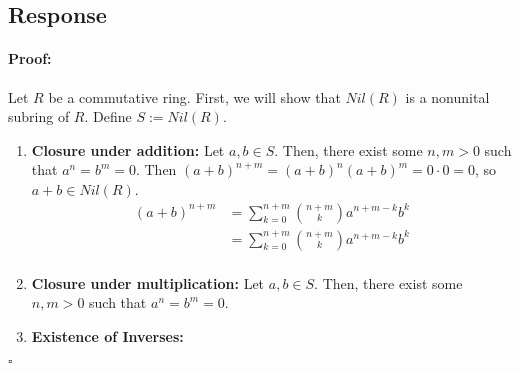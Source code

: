 \documentclass [12pt] {article}
\newenvironment{proof}{\paragraph{Proof:}}{\hfill$\square$}
\renewcommand{\bf}[1]{\textbf{{#1}}}
\begin{document}
\subsection*{Response}
\begin{proof}
    Let $R$ be a commutative ring. First, we will show that $Nil(R)$ is a nonunital subring of $R$.
    Define $S := Nil(R)$.
    \begin{enumerate}
        \item \bf{Closure under addition:} Let $a, b \in S$. Then, there exist some $n, m > 0$ such
            that $a^n = b^m = 0$. Then $(a + b)^{n + m} = (a + b)^n (a + b)^m = 0 \cdot 0 = 0$, so
            $a + b \in Nil(R)$.
            \begin{align*}
                (a + b)^{n + m} 
                &= \sum^{n + m}_{k = 0} \binom{n + m}{k} a^{n + m - k} b^k \\
                &=
                \sum^{n + m}_{k = 0} \binom{n + m}{k} a^{n + m - k} b^k \\
            \end{align*}
        \item \bf{Closure under multiplication:} Let $a, b \in S$. Then, there exist some $n, m > 0$
            such that $a^n = b^m = 0$.
        \item \bf{Existence of Inverses:}
    \end{enumerate}
\end{proof}
\newpage
\end{document}
